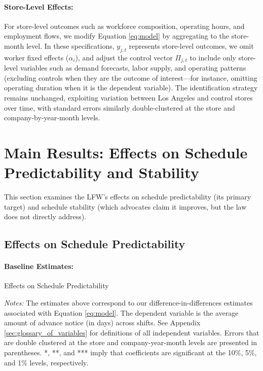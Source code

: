 \documentclass[letterpaper,11pt,leqno]{article}
\theoremstyle{paper}
\newcommand{\note}[2][]{\parbox{\textwidth}{\footnotesize\vspace*{10pt}\textit{#1}#2}}
\begin{document}
\paragraph{Store-Level Effects:}
For store-level outcomes such as workforce composition, operating hours, and employment flows, we modify Equation \ref{eq:model} by aggregating to the store-month level. In these specifications, $y_{j,t}$ represents store-level outcomes, we omit worker fixed effects ($\alpha_i$), and adjust the control vector $\Pi_{j,t}$ to include only store-level variables such as demand forecasts, labor supply, and operating patterns (excluding controls when they are the outcome of interest—for instance, omitting operating duration when it is the dependent variable). The identification strategy remains unchanged, exploiting variation between Los Angeles and control stores over time, with standard errors similarly double-clustered at the store and company-by-year-month levels.


\section{Main Results: Effects on Schedule Predictability and Stability} \label{sec:main_results}

This section examines the LFW's effects on schedule predictability (its primary target) and schedule stability (which advocates claim it improves, but the law does not directly address).

\subsection{Effects on Schedule Predictability} \label{subsec:advance_notice}

\paragraph{Baseline Estimates:}

\begin{singlespace}
\begin{table}[h]
\caption{Effects on Schedule Predictability}

\scriptsize 
\note{\textit{Notes: } The estimates above correspond to our difference-in-differences estimates associated with Equation \ref{eq:model}. The dependent variable is the average amount of advance notice (in days) across shifts. See Appendix \ref{sec:glossary_of_variables} for definitions of all independent variables. Errors that are double clustered at the store and company-year-month levels are presented in parentheses. *, **, and *** imply that coefficients are significant at the 10\%, 5\%, and 1\% levels, respectively.}
\label{table:adv_notice}
\end{table}
\end{singlespace}
\end{document}
